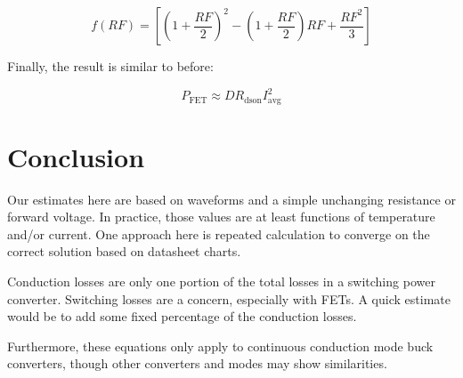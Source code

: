 \documentclass{article}
\begin{document}
\begin{equation}
f(RF) = \left[ (1+\frac{RF}{2})^2 - (1+\frac{RF}{2})RF + \frac{RF^2}{3} \right]
\end{equation}

Finally, the result is similar to before:

\begin{equation}
P_\text{FET} \approx D R_\text{dson} I_\text{avg}^2
\end{equation}

\section{Conclusion}
Our estimates here are based on waveforms and a simple unchanging resistance or forward voltage.  In practice, those values are at least functions of temperature and/or current.  One approach here is repeated calculation to converge on the correct solution based on datasheet charts.

Conduction losses are only one portion of the total losses in a switching power converter.
Switching losses are a concern, especially with FETs.  A quick estimate would be to add some fixed percentage of the conduction losses.

Furthermore, these equations only apply to continuous conduction mode buck converters, though other converters and modes may show similarities.
\end{document}
